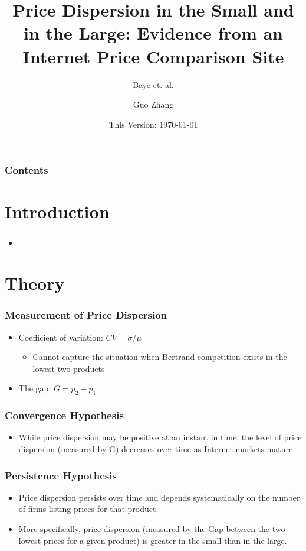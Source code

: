 \documentclass{beamer}
\title{Price Dispersion in the Small and in the Large: Evidence from an Internet Price Comparison Site}
\subtitle{Baye et. al.}
\author{Guo Zhang}
\institute{WISE, Xiamen University}
\date{This Version: \today}
\begin{document}
\begin{frame}
\maketitle
\end{frame}

\begin{frame}[plain]
\frametitle{Contents}
\tableofcontents[hideallsubsections]
\end{frame}

\section{Introduction}
\begin{frame}
\frametitle{}
\begin{itemize}
\item 
\end{itemize}
\end{frame}

\section{Theory}
\begin{frame}
\frametitle{Measurement of Price Dispersion}
\begin{itemize}
\item Coefficient of variation: $CV=\sigma/\mu$
\begin{itemize}
\item Cannot capture the situation when Bertrand competition exists in the lowest two products
\end{itemize}
\item The gap: $G=p_2-p_1$
\end{itemize}
\end{frame}

\begin{frame}
\frametitle{Convergence Hypothesis}
\begin{itemize}
\item While price dispersion may be positive at an instant in time, the level of price dispersion (measured by G) decreases over time as Internet markets mature.
\end{itemize}
\end{frame}

\begin{frame}
\frametitle{Persistence Hypothesis}
\begin{itemize}
\item Price dispersion persists over time and depends systematically on the number of firms listing prices for that product. 
\item More specifically, price dispersion (measured by the Gap between the two lowest prices for a given product) is greater in the small than in the large.
\end{itemize}
\end{frame}
\end{document}
